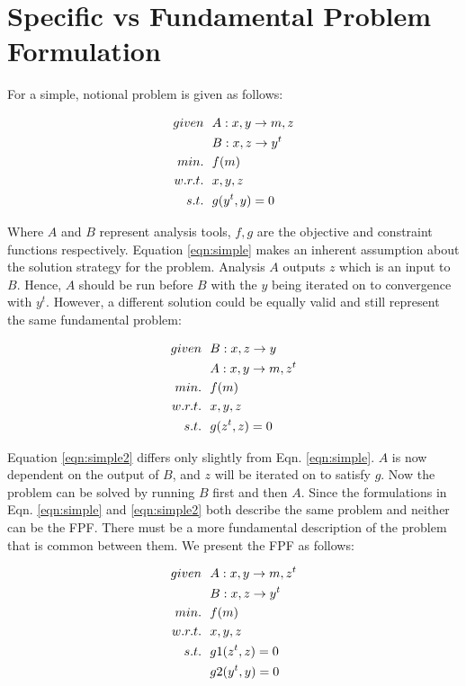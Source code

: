 \section{Specific vs Fundamental Problem Formulation }
    For a simple, notional problem  is given as follows: 

    \begin{align}
        given & \ \ A: {x,y} \rightarrow {m,z} \notag
        \\      & \ \ B: {x,z} \rightarrow {y^t} \notag
        \\min. &\ \ f(m) \notag
        \\w.r.t. & \ \ x,y,z \notag
        \\s.t. & \ \ g(y^t,y) = 0
        \label{eqn:simple}
    \end{align}

    Where $A$ and $B$ represent analysis tools, $f,g$ are the objective and constraint functions respectively. 
    Equation \ref{eqn:simple} makes an inherent assumption about the solution strategy for the problem. 
    Analysis $A$ outputs $z$ which is an input to $B$. Hence, $A$ should be run before $B$ with 
    the $y$ being iterated on to convergence with $y^t$. However, a different solution could be equally valid and still represent
    the same fundamental problem: 

    \begin{align}
        given & \ \ B: {x,z} \rightarrow {y} \notag
        \\      & \ \ A: {x,y} \rightarrow {m,z^t} \notag
        \\min. &\ \ f(m) \notag
        \\w.r.t. & \ \ x,y,z \notag
        \\s.t. & \ \ g(z^t,z) = 0
        \label{eqn:simple2}
    \end{align}

    Equation \ref{eqn:simple2} differs only slightly from Eqn. \ref{eqn:simple}. $A$ is now dependent on the output of $B$, 
    and $z$ will be iterated on to satisfy $g$. Now the problem can be solved by running $B$ first and then $A$.
    Since the formulations in Eqn. \ref{eqn:simple} and \ref{eqn:simple2} both describe the same problem and neither can be the FPF. 
    There must be a more fundamental description of the problem that is common between them. We present the FPF as follows: 

    \begin{align}
        given & \ \ A: {x,y} \rightarrow {m,z^t} \notag
        \\      & \ \ B: {x,z} \rightarrow {y^t} \notag
        \\min. &\ \ f(m) \notag
        \\w.r.t. & \ \ x,y,z \notag
        \\s.t. & \ \ g1(z^t,z) = 0 \notag
        \\     & \ \ g2(y^t,y) = 0
        \label{eqn:simple_fpf}
    \end{align}

